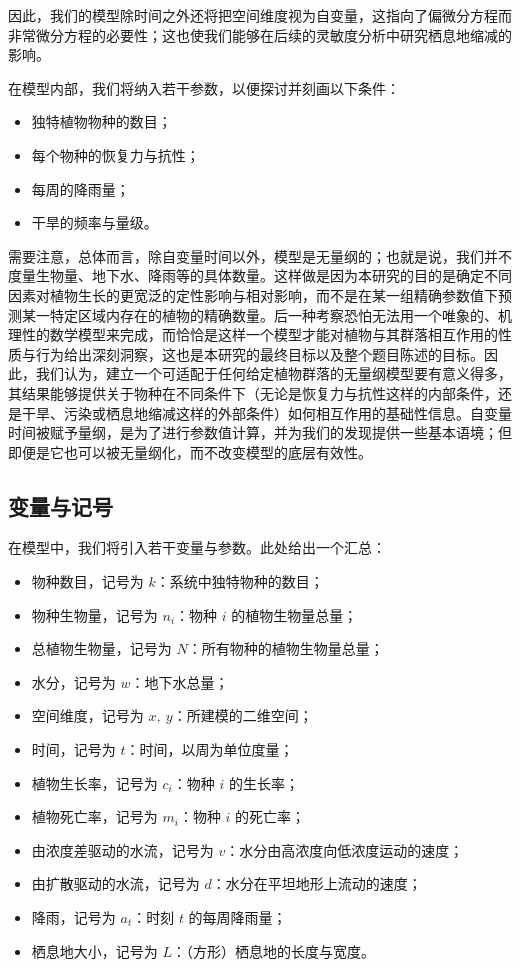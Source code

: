 \documentclass[11pt,a4paper]{ctexart}
\begin{document}
因此，我们的模型除时间之外还将把空间维度视为自变量，这指向了偏微分方程而非常微分方程的必要性；这也使我们能够在后续的灵敏度分析中研究栖息地缩减的影响。

在模型内部，我们将纳入若干参数，以便探讨并刻画以下条件：

\begin{itemize}
\item 独特植物物种的数目；
\item 每个物种的恢复力与抗性；
\item 每周的降雨量；
\item 干旱的频率与量级。
\end{itemize}

需要注意，总体而言，除自变量时间以外，模型是无量纲的；也就是说，我们并不度量生物量、地下水、降雨等的具体数量。这样做是因为本研究的目的是确定不同因素对植物生长的更宽泛的定性影响与相对影响，而不是在某一组精确参数值下预测某一特定区域内存在的植物的精确数量。后一种考察恐怕无法用一个唯象的、机理性的数学模型来完成，而恰恰是这样一个模型才能对植物与其群落相互作用的性质与行为给出深刻洞察，这也是本研究的最终目标以及整个题目陈述的目标。因此，我们认为，建立一个可适配于任何给定植物群落的无量纲模型要有意义得多，其结果能够提供关于物种在不同条件下（无论是恢复力与抗性这样的内部条件，还是干旱、污染或栖息地缩减这样的外部条件）如何相互作用的基础性信息。自变量时间被赋予量纲，是为了进行参数值计算，并为我们的发现提供一些基本语境；但即便是它也可以被无量纲化，而不改变模型的底层有效性。

\subsection{变量与记号}

在模型中，我们将引入若干变量与参数。此处给出一个汇总：

\begin{itemize}
\item 物种数目，记号为 $k$：系统中独特物种的数目；
\item 物种生物量，记号为 $n_i$：物种 $i$ 的植物生物量总量；
\item 总植物生物量，记号为 $N$：所有物种的植物生物量总量；
\item 水分，记号为 $w$：地下水总量；
\item 空间维度，记号为 $x,\ y$：所建模的二维空间；
\item 时间，记号为 $t$：时间，以周为单位度量；
\item 植物生长率，记号为 $c_i$：物种 $i$ 的生长率；
\item 植物死亡率，记号为 $m_i$：物种 $i$ 的死亡率；
\item 由浓度差驱动的水流，记号为 $v$：水分由高浓度向低浓度运动的速度；
\item 由扩散驱动的水流，记号为 $d$：水分在平坦地形上流动的速度；
\item 降雨，记号为 $a_t$：时刻 $t$ 的每周降雨量；
\item 栖息地大小，记号为 $L$：（方形）栖息地的长度与宽度。
\end{itemize}
\end{document}
